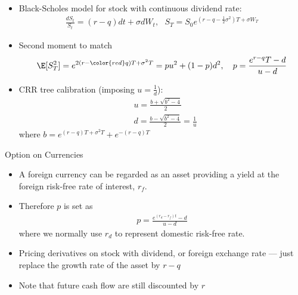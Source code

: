 \begin{frame}[fragile]
\begin{itemize}
\item Black-Scholes model for stock with continuous dividend rate:
\begin{align*}
\frac{dS_t}{S_t} = (r-q) dt + \sigma dW_t,~~~S_T = S_0 e^{(r-q-\frac12 \sigma^2)T + \sigma W_T}
\end{align*}
    \item Second moment to match
    \begin{align}
        \E[S_T^2] = e^{2(r-{\color{red}q})T + \sigma^2 T} = p u^2 + (1-p) d^2, ~~~ p = \frac{e^{r-q}T - d}{u-d}
\end{align}
\item CRR tree calibration (imposing $u = \frac1d$):
\begin{align}
& u = \frac{b + \sqrt{b^2 - 4}}{2} \\
& d = \frac{b - \sqrt{b^2 - 4}}{2} = \frac1u
\end{align} where $b = e^{(r-q)T+\sigma^{2}T} + e^{-(r-q)T}$

\end{itemize}
\end{frame}

\begin{frame}[fragile]{Option on Currencies}
    \begin{itemize}
        \item A foreign currency can be regarded as an asset providing
a yield at the foreign risk-free rate of interest, $r_f$.
        \item Therefore $p$ is set as
        \begin{align}
            p = \frac {e^{(r_d-r_f)t} - d}{u-d}
\end{align} where we normally use $r_d$ to represent domestic risk-free rate.
\item Pricing derivatives on stock with dividend, or foreign exchange rate --- just replace the growth rate of the asset by $r-q$
\item Note that future cash flow are still discounted by $r$
\end{itemize}
\end{frame}

